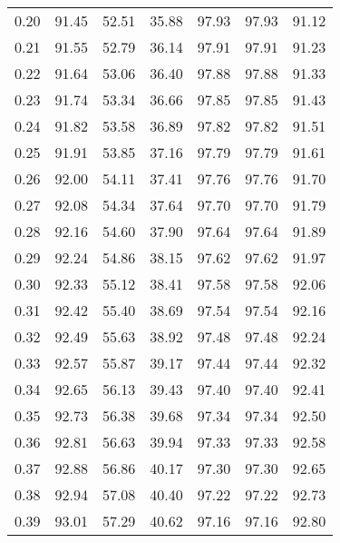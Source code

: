 \begin{tabular}{|c|c|c|c|c|c|c|}
      0.20 &     91.45 &     52.51 &      35.88 &   97.93 &      97.93 &         91.12 \\
      0.21 &     91.55 &     52.79 &      36.14 &   97.91 &      97.91 &         91.23 \\
      0.22 &     91.64 &     53.06 &      36.40 &   97.88 &      97.88 &         91.33 \\
      0.23 &     91.74 &     53.34 &      36.66 &   97.85 &      97.85 &         91.43 \\
      0.24 &     91.82 &     53.58 &      36.89 &   97.82 &      97.82 &         91.51 \\
      0.25 &     91.91 &     53.85 &      37.16 &   97.79 &      97.79 &         91.61 \\
      0.26 &     92.00 &     54.11 &      37.41 &   97.76 &      97.76 &         91.70 \\
      0.27 &     92.08 &     54.34 &      37.64 &   97.70 &      97.70 &         91.79 \\
      0.28 &     92.16 &     54.60 &      37.90 &   97.64 &      97.64 &         91.89 \\
      0.29 &     92.24 &     54.86 &      38.15 &   97.62 &      97.62 &         91.97 \\
      0.30 &     92.33 &     55.12 &      38.41 &   97.58 &      97.58 &         92.06 \\
      0.31 &     92.42 &     55.40 &      38.69 &   97.54 &      97.54 &         92.16 \\
      0.32 &     92.49 &     55.63 &      38.92 &   97.48 &      97.48 &         92.24 \\
      0.33 &     92.57 &     55.87 &      39.17 &   97.44 &      97.44 &         92.32 \\
      0.34 &     92.65 &     56.13 &      39.43 &   97.40 &      97.40 &         92.41 \\
      0.35 &     92.73 &     56.38 &      39.68 &   97.34 &      97.34 &         92.50 \\
      0.36 &     92.81 &     56.63 &      39.94 &   97.33 &      97.33 &         92.58 \\
      0.37 &     92.88 &     56.86 &      40.17 &   97.30 &      97.30 &         92.65 \\
      0.38 &     92.94 &     57.08 &      40.40 &   97.22 &      97.22 &         92.73 \\
      0.39 &     93.01 &     57.29 &      40.62 &   97.16 &      97.16 &         92.80 \\

\end{tabular}

